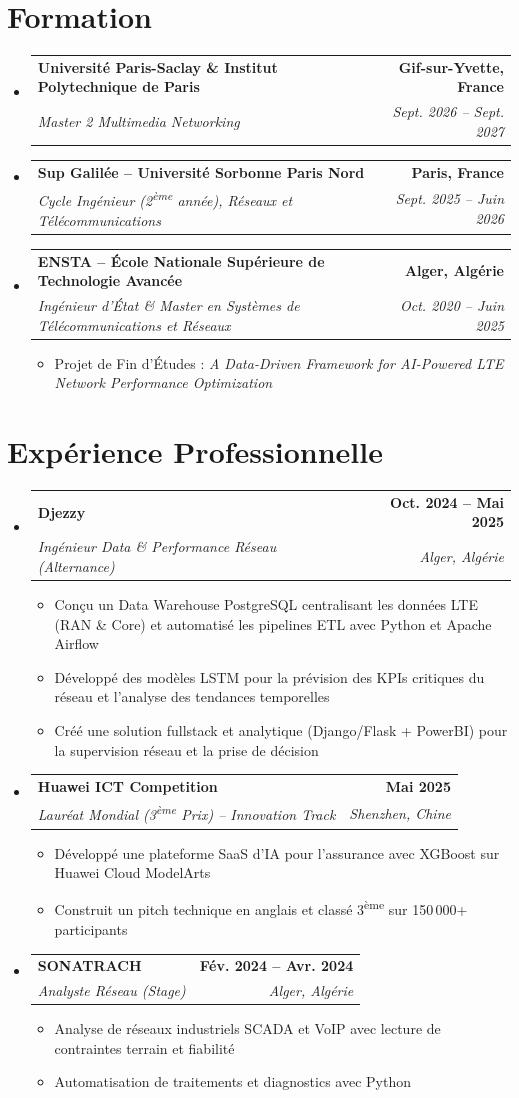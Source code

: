 \documentclass[a4paper,10pt]{article}
\makeatletter
\newcommand{\resumeItem}[1]{\item\small{#1\vspace{-2pt}}}
\newcommand{\resumeSubheading}[4]{
  \vspace{-2pt}\item
    \begin{tabular*}{0.98\textwidth}[t]{l@{\extracolsep{\fill}}r}
      \textbf{#1} & \textbf{#2} \\
      \textit{\small#3} & \textit{\small #4} \\
    \end{tabular*}\vspace{-7pt}
}
\newcommand{\resumeSubHeadingListStart}{\begin{itemize}[leftmargin=0.15in,label={}]}
\newcommand{\resumeSubHeadingListEnd}{\end{itemize}}
\newcommand{\resumeItemListStart}{\begin{itemize}[leftmargin=*,itemsep=2pt,topsep=2pt]}
\newcommand{\resumeItemListEnd}{\end{itemize}\vspace{-4pt}}
\makeatother
\begin{document}
\section{Formation}
\resumeSubHeadingListStart
  \resumeSubheading
    {Université Paris-Saclay \& Institut Polytechnique de Paris}{Gif-sur-Yvette, France}
    {Master 2 Multimedia Networking}{Sept. 2026 -- Sept. 2027}
  \resumeSubheading
    {Sup Galilée -- Université Sorbonne Paris Nord}{Paris, France}
    {Cycle Ingénieur (2\textsuperscript{ème} année), Réseaux et Télécommunications}{Sept. 2025 -- Juin 2026}
  \resumeSubheading
    {ENSTA -- École Nationale Supérieure de Technologie Avancée}{Alger, Algérie}
    {Ingénieur d'État \& Master en Systèmes de Télécommunications et Réseaux}{Oct. 2020 -- Juin 2025}
    \resumeItemListStart
      \resumeItem{Projet de Fin d'Études : \textit{A Data-Driven Framework for AI-Powered LTE Network Performance Optimization}}
    \resumeItemListEnd
\resumeSubHeadingListEnd

\section{Expérience Professionnelle}
\resumeSubHeadingListStart
  \resumeSubheading
    {Djezzy}{Oct. 2024 -- Mai 2025}
    {Ingénieur Data \& Performance Réseau (Alternance)}{Alger, Algérie}
    \resumeItemListStart
      \resumeItem{Conçu un Data Warehouse PostgreSQL centralisant les données LTE (RAN \& Core) et automatisé les pipelines ETL avec Python et Apache Airflow}
      \resumeItem{Développé des modèles LSTM pour la prévision des KPIs critiques du réseau et l'analyse des tendances temporelles}
      \resumeItem{Créé une solution fullstack et analytique (Django/Flask + PowerBI) pour la supervision réseau et la prise de décision}
    \resumeItemListEnd

  \resumeSubheading
    {Huawei ICT Competition}{Mai 2025}
    {Lauréat Mondial (3\textsuperscript{ème} Prix) -- Innovation Track}{Shenzhen, Chine}
    \resumeItemListStart
      \resumeItem{Développé une plateforme SaaS d'IA pour l'assurance avec XGBoost sur Huawei Cloud ModelArts}
      \resumeItem{Construit un pitch technique en anglais et classé 3\textsuperscript{ème} sur 150\,000+ participants}
    \resumeItemListEnd

  \resumeSubheading
    {SONATRACH}{Fév. 2024 -- Avr. 2024}
    {Analyste Réseau (Stage)}{Alger, Algérie}
    \resumeItemListStart
      \resumeItem{Analyse de réseaux industriels SCADA et VoIP avec lecture de contraintes terrain et fiabilité}
      \resumeItem{Automatisation de traitements et diagnostics avec Python}
    \resumeItemListEnd
\resumeSubHeadingListEnd
\end{document}
